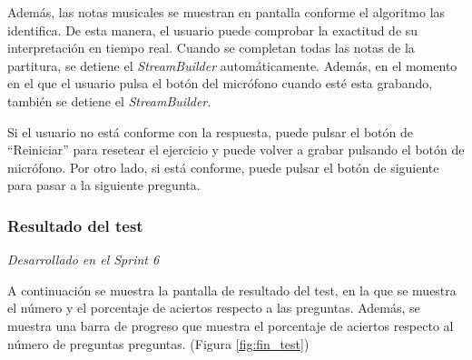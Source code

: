 Además, las notas musicales se muestran en pantalla conforme el algoritmo las identifica. De esta manera, el usuario puede comprobar la exactitud de su interpretación en tiempo real.
Cuando se completan todas las notas de la partitura, se detiene el \textit{StreamBuilder} automáticamente.
Además, en el momento en el que el usuario pulsa el botón del micrófono cuando esté esta grabando, también se detiene el \textit{StreamBuilder}.

Si el usuario no está conforme con la respuesta, puede pulsar el botón de ``Reiniciar'' para resetear el ejercicio y puede volver a grabar pulsando el botón de micrófono. 
Por otro lado, si está conforme, puede pulsar el botón de siguiente para pasar a la siguiente pregunta.

\subsubsection{Resultado del test}
\label{sec:pregunta}
\textit{Desarrollado en el Sprint 6}

A continuación se muestra la pantalla de resultado del test, en la que se muestra el número y el porcentaje de aciertos respecto a las preguntas. 
Además, se muestra una barra de progreso que muestra el porcentaje de aciertos respecto al número de preguntas preguntas. (Figura \ref{fig:fin_test})

